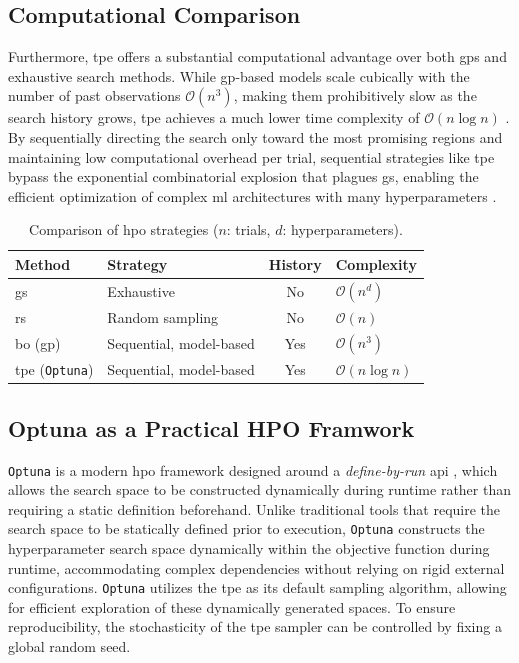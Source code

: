 \subsection{Computational Comparison}
\label{sec:theoretical_hpo_comparison}

Furthermore, \gls{tpe} offers a substantial computational advantage over both \glspl{gp} and exhaustive search methods. While \gls{gp}-based models scale cubically with the number of past observations $\mathcal{O}(n^3)$, making them prohibitively slow as the search history grows, \gls{tpe} achieves a much lower time complexity of $\mathcal{O}(n \log n)$ \parencite{yangHyperparameterOptimizationMachine2020}. By sequentially directing the search only toward the most promising regions and maintaining low computational overhead per trial, sequential strategies like \gls{tpe} bypass the exponential combinatorial explosion that plagues \gls{gs}, enabling the efficient optimization of complex \gls{ml} architectures with many hyperparameters \parencite{yangHyperparameterOptimizationMachine2020}.

\begin{table}[ht]
\centering
\caption{Comparison of \acrshort{hpo} strategies ($n$: trials, $d$: hyperparameters).}
\label{tab:hpo_comparison}
\begin{tabular}{llcl}
\toprule
\textbf{Method} & \textbf{Strategy} & \textbf{History} & \textbf{Complexity} \\
\midrule
\gls{gs}              & Exhaustive          & No  & $\mathcal{O}(n^d)$  \\
\gls{rs}              & Random sampling     & No  & $\mathcal{O}(n)$ \\
\gls{bo} (\gls{gp})         & Sequential, model-based & Yes & $\mathcal{O}(n^3)$ \\
\gls{tpe} (\texttt{Optuna}) & Sequential, model-based & Yes & $\mathcal{O}(n \log n)$  \\
\bottomrule
\end{tabular}
\end{table}

\subsection{Optuna as a Practical HPO Framwork}
\label{sec:theoretical_optuna}

\texttt{Optuna} is a modern \gls{hpo} framework designed around a \textit{define-by-run} \gls{api} \parencite{akibaOptunaNextgenerationHyperparameter2019}, which allows the search space to be constructed dynamically during runtime rather than requiring a static definition beforehand. Unlike traditional tools that require the search space to be statically defined prior to execution, \texttt{Optuna} constructs the hyperparameter search space dynamically within the objective function during runtime, accommodating complex dependencies without relying on rigid external configurations. \texttt{Optuna} utilizes the \gls{tpe} as its default sampling algorithm, allowing for efficient exploration of these dynamically generated spaces. To ensure reproducibility, the stochasticity of the \gls{tpe} sampler can be controlled by fixing a global random seed.

